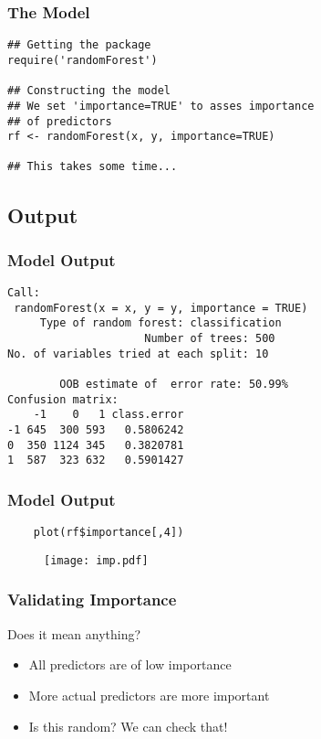 \documentclass[utf8]{beamer}
\theoremstyle{definition}
\theoremstyle{remark}
\begin{document}
\begin{frame}[fragile]
  \frametitle{The Model}
    \begin{lstlisting}
## Getting the package
require('randomForest')

## Constructing the model
## We set 'importance=TRUE' to asses importance
## of predictors
rf <- randomForest(x, y, importance=TRUE)

## This takes some time...
    \end{lstlisting}
\end{frame}

\subsection{Output}
\begin{frame}[fragile]
  \frametitle{Model Output}
    \begin{lstlisting}
Call:
 randomForest(x = x, y = y, importance = TRUE) 
     Type of random forest: classification
                     Number of trees: 500
No. of variables tried at each split: 10

        OOB estimate of  error rate: 50.99%
Confusion matrix:
    -1    0   1 class.error
-1 645  300 593   0.5806242
0  350 1124 345   0.3820781
1  587  323 632   0.5901427
    \end{lstlisting}
\end{frame}
\begin{frame}[fragile]
  \frametitle{Model Output}
    \begin{lstlisting}
    plot(rf$importance[,4])
    \end{lstlisting}
    \begin{figure}
      \centering
      \texttt{[image: imp.pdf]}
      \label{fig:digraph}
    \end{figure}
\end{frame}

\begin{frame}[fragile]
  \frametitle{Validating Importance}
  \begin{block}{Does it mean anything?}
    \begin{itemize}\pause
      \item All predictors are of low importance\pause
      \item More actual predictors are more important\pause
      \item Is this random? We can check that!
    \end{itemize}
  \end{block}
\end{frame}
\end{document}
